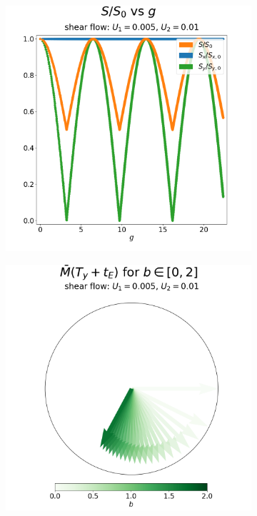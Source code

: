 \begin{figure}
\begin{subfigure}{0.4\textwidth}
                        \includegraphics[width=\textwidth]{diagrams/results-mri/simple-tests/mri-spins_gall-vs-b_2D_shear_test_1.png}
                        \caption{}
                        \label{fig:mri-shear-1:s-vs-g}
                    \end{subfigure}
                    \begin{subfigure}{0.4\textwidth}
                        \centering
                        \includegraphics[width=\textwidth]{diagrams/results-mri/simple-tests/mri-spins_b_2D_shear_test_1.png}

\end{subfigure}
\end{figure}

